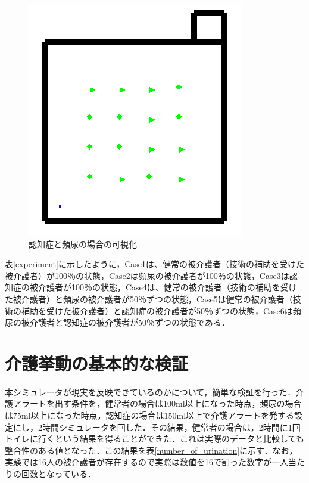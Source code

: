 \begin{figure}[htb]
\begin{center}
 \includegraphics[scale=0.5]{figures/dementia_urinate_v1.png}
 \caption[認知症と頻尿の場合の可視化]{認知症と頻尿の場合の可視化 \label{dementia_urinate_v1}}
\end{center}
\end{figure}

表\ref{experiment}に示したように，Case1は、健常の被介護者（技術の補助を受けた被介護者）が100％の状態，Case2は頻尿の被介護者が100％の状態，Case3は認知症の被介護者が100％の状態，Case4は、健常の被介護者（技術の補助を受けた被介護者）と頻尿の被介護者が50％ずつの状態，Case5は健常の被介護者（技術の補助を受けた被介護者）と認知症の被介護者が50％ずつの状態，Case6は頻尿の被介護者と認知症の被介護者が50％ずつの状態である．

\section{介護挙動の基本的な検証}

本シミュレータが現実を反映できているのかについて，簡単な検証を行った．介護アラートを出す条件を，健常者の場合は100ml以上になった時点，頻尿の場合は75ml以上になった時点，認知症の場合は150ml以上で介護アラートを発する設定にし，2時間シミュレータを回した．その結果，健常者の場合は，2時間に1回トイレに行くという結果を得ることができた．これは実際のデータと比較しても整合性のある値となった．この結果を表\ref{number_of_urination}に示す．なお，実験では16人の被介護者が存在するので実際は数値を16で割った数字が一人当たりの回数となっている．

